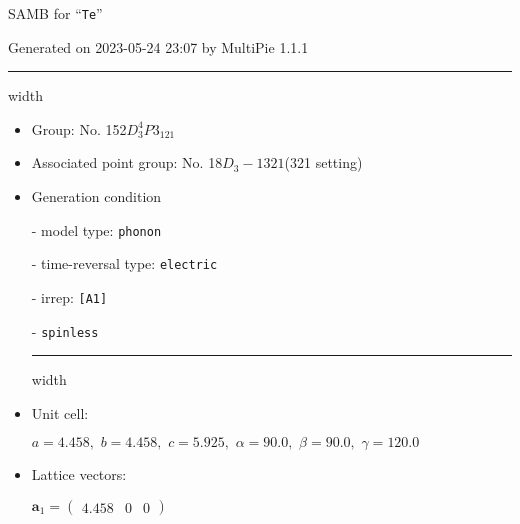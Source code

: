 \documentclass[fleqn,10pt,landscape]{article}
\begin{document}
\setcounter{MaxMatrixCols}{16}

\setlength{\baselineskip}{16pt}
\footnotesize
\begin{center}
\LARGE
SAMB for ``\texttt{Te}''
\end{center}
\begin{flushright}
Generated on 2023-05-24 23:07 by MultiPie 1.1.1
\end{flushright}
\vspace{1cm}


 \hfil \hrule height 1mm width \textwidth \hfil

\begin{itemize}
\item Group: No. 152\quad$D_{3}^{4}$\quad$P3_121$\quad[ trigonal ]

\item Associated point group: No. 18\quad$D_{3}-1$\quad$321$\quad(321 setting)\quad[ trigonal ]

\vspace{5mm}

\item Generation condition

\quad - model type: \texttt{phonon}

\quad - time-reversal type: \texttt{electric}

\quad - irrep: \texttt{[A1]}

\quad - \texttt{spinless}


 \hfil \hrule height 1mm width \textwidth \hfil

\item Unit cell:

\quad $a=4.458,\,\, b=4.458,\,\, c=5.925,\,\, \alpha=90.0,\,\, \beta=90.0,\,\, \gamma=120.0$

\item Lattice vectors:

\quad $\bm{a}_1=\begin{pmatrix} 4.458 & 0 & 0 \end{pmatrix}$


\end{itemize}
\end{document}
